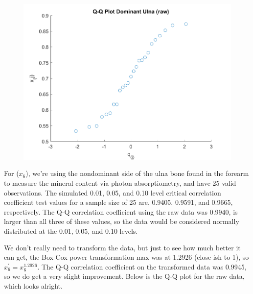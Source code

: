 \begin{center}
    \begin{figure}[H]
        \centering
        \includegraphics[scale=0.6]{./matlab/chapter-4/sol4.34.qq.5.png}
    \end{figure}
\end{center}

For ($x_{6}$), we're using the nondominant side of the ulna bone found in the forearm to measure the mineral content via photon absorptiometry, and have 25 valid observations. The simulated 0.01, 0.05, and 0.10 level critical correlation coefficient test values for a sample size of 25 are, 0.9405, 0.9591, and 0.9665, respectively. The Q-Q correlation coefficient using the raw data was 0.9940, is larger than all three of these values, so the data would be considered normally distributed at the 0.01, 0.05, and 0.10 levels.

We don't really need to transform the data, but just to see how much better it can get, the Box-Cox power transformation max was at 1.2926 (close-ish to 1), so $x_{6}^{\prime} = x_{6}^{1.2926}$. The Q-Q correlation coefficient on the transformed data was 0.9945, so we do get a very slight improvement. Below is the Q-Q plot for the raw data, which looks alright.

